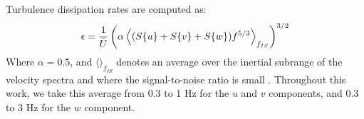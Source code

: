 Turbulence dissipation rates are computed as:
\begin{align}
  \epsilon = \frac{1}{\bar{U}}\left(\alpha\left\langle(S\{u\}+S\{v\}+S\{w\})f^{5/3}\right\rangle_{f_{IS}}\right)^{3/2}
\end{align}
Where  $\alpha=0.5$, and $\langle\rangle_{f_{IS}}$ denotes an average over the inertial subrange of the velocity spectra and where the signal-to-noise ratio is small \cite[]{Lumley+Terray1983,Sreenivasan1995}. Throughout this work, we take this average from 0.3 to 1 Hz for the $u$ and $v$ components, and 0.3 to 3 Hz for the $w$ component.

